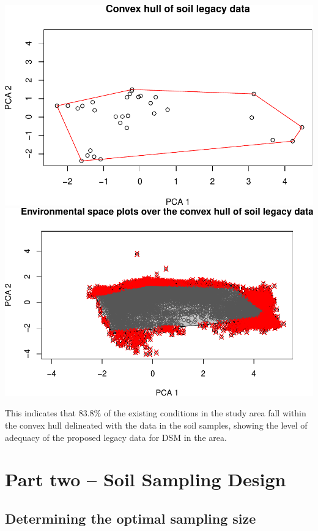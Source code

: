 \documentclass[
  10pt,
  b5paper,
  oneside]{book}
\begin{document}
\includegraphics{Technical-Manual-Soil-Sampling-Design_files/figure-latex/fig-4-1.pdf} \includegraphics{Technical-Manual-Soil-Sampling-Design_files/figure-latex/fig-4-2.pdf}

This indicates that 83.8\% of the existing conditions in the study area fall within the convex hull delineated with the data in the soil samples, showing the level of adequacy of the proposed legacy data for DSM in the area.

\hypertarget{part-part-two-soil-sampling-design}{%
\part{Part two -- Soil Sampling Design}\label{part-part-two-soil-sampling-design}}

\hypertarget{determining-the-optimal-sampling-size}{%
\chapter{Determining the optimal sampling size}\label{determining-the-optimal-sampling-size}}
\end{document}
